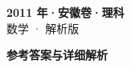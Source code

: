 \documentclass[zihao=-4, a4paper]{ctexart}
\begin{document}
\begin{center}
  {\Large\bfseries 2011 年·安徽卷·理科}\\[4pt]
  {\large 数学 · 解析版}
\end{center}
\medskip
{}

\clearpage
{}
\begin{center}{\Large\bfseries 参考答案与详细解析}\end{center}
\medskip

\end{document}
